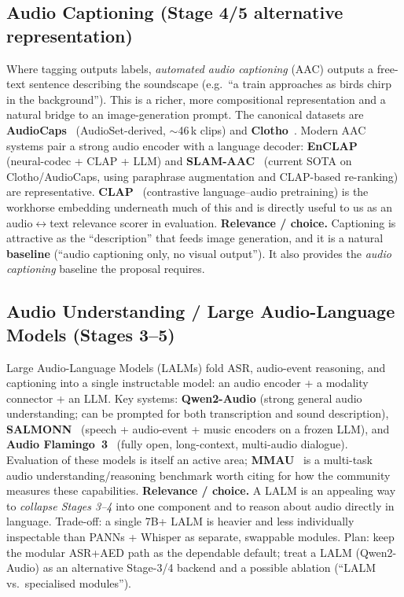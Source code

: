\documentclass[11pt,a4paper]{article}
\begin{document}
\subsection{Audio Captioning (Stage 4/5 alternative representation)}
Where tagging outputs labels, \emph{automated audio captioning} (AAC) outputs a free-text sentence
describing the soundscape (e.g.\ ``a train approaches as birds chirp in the background''). This is a
richer, more compositional representation and a natural bridge to an image-generation prompt. The
canonical datasets are \textbf{AudioCaps}~\cite{audiocaps} (AudioSet-derived, $\sim$46\,k clips) and
\textbf{Clotho}~\cite{clotho}. Modern AAC systems pair a strong audio encoder with a language
decoder: \textbf{EnCLAP}~\cite{enclap} (neural-codec + CLAP + LLM) and \textbf{SLAM-AAC}~\cite{slamaac}
(current SOTA on Clotho/AudioCaps, using paraphrase augmentation and CLAP-based re-ranking) are
representative. \textbf{CLAP}~\cite{clap} (contrastive language--audio pretraining) is the workhorse
embedding underneath much of this and is directly useful to us as an audio$\leftrightarrow$text
relevance scorer in evaluation.
\textbf{Relevance / choice.} Captioning is attractive as the ``description'' that feeds image
generation, and it is a natural \textbf{baseline} (``audio captioning only, no visual output'').
It also provides the \emph{audio captioning} baseline the proposal requires.

\subsection{Audio Understanding / Large Audio-Language Models (Stages 3--5)}
Large Audio-Language Models (LALMs) fold ASR, audio-event reasoning, and captioning into a single
instructable model: an audio encoder + a modality connector + an LLM. Key systems: \textbf{Qwen2-Audio}
\cite{qwenaudio} (strong general audio understanding; can be prompted for both transcription and
sound description), \textbf{SALMONN}~\cite{salmonn} (speech + audio-event + music encoders on a
frozen LLM), and \textbf{Audio Flamingo~3}~\cite{audioflamingo3} (fully open, long-context,
multi-audio dialogue). Evaluation of these models is itself an active area; \textbf{MMAU}~\cite{mmau}
is a multi-task audio understanding/reasoning benchmark worth citing for how the community measures
these capabilities.
\textbf{Relevance / choice.} A LALM is an appealing way to \emph{collapse Stages 3--4} into one
component and to reason about audio directly in language. Trade-off: a single 7B+ LALM is heavier
and less individually inspectable than PANNs + Whisper as separate, swappable modules. Plan: keep
the modular ASR+AED path as the dependable default; treat a LALM (Qwen2-Audio) as an alternative
Stage-3/4 backend and a possible ablation (``LALM vs.\ specialised modules'').
\end{document}
